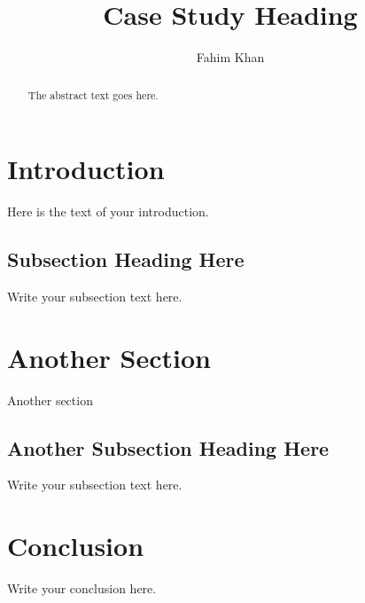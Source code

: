 \documentclass{article}
\begin{document}
\title{Case Study Heading}
\author{Fahim Khan}

\maketitle

\begin{abstract}
The abstract text goes here.
\end{abstract}

\section{Introduction}
Here is the text of your introduction.


\subsection{Subsection Heading Here}
Write your subsection text here.

\section{Another Section}
Another section

\subsection{Another Subsection Heading Here}
Write your subsection text here.



\section{Conclusion}
Write your conclusion here.
\end{document}
